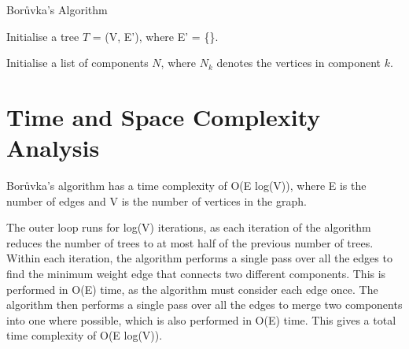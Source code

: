 \documentclass[a4paper, 11pt]{article}
\begin{document}
\begin{algorithm}
    \caption{Borůvka's Algorithm}
    

    \nl Initialise a tree $T$ = (V, E'), where E' = \{\}.

    \nl Initialise a list of components $N$, where $N_k$ denotes the vertices in component $k$.

    \nl {}

    \nl {}
\end{algorithm}

\section{Time and Space Complexity Analysis}
Borůvka's algorithm has a time complexity of O(E log(V)), where E is the number of edges and V is the number of vertices in the graph.

The outer loop runs for log(V) iterations, as each iteration of the algorithm reduces the number of trees to at most half of the previous number of trees. Within each iteration, the algorithm performs a single pass over all the edges to find the minimum weight edge that connects two different components. This is performed in O(E) time, as the algorithm must consider each edge once. The algorithm then performs a single pass over all the edges to merge two components into one where possible, which is also performed in O(E) time. This gives a total time complexity of O(E log(V)).
\end{document}
